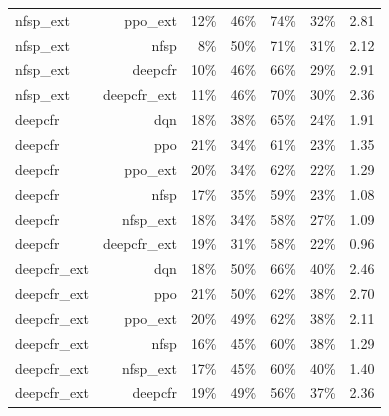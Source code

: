 \begin{tabular}{lrrrrrr}
nfsp\_ext & ppo\_ext & 12\% & 46\% & 74\% & 32\% & 2.81 \\
nfsp\_ext & nfsp & 8\% & 50\% & 71\% & 31\% & 2.12 \\
nfsp\_ext & deepcfr & 10\% & 46\% & 66\% & 29\% & 2.91 \\
nfsp\_ext & deepcfr\_ext & 11\% & 46\% & 70\% & 30\% & 2.36 \\
deepcfr & dqn & 18\% & 38\% & 65\% & 24\% & 1.91 \\
deepcfr & ppo & 21\% & 34\% & 61\% & 23\% & 1.35 \\
deepcfr & ppo\_ext & 20\% & 34\% & 62\% & 22\% & 1.29 \\
deepcfr & nfsp & 17\% & 35\% & 59\% & 23\% & 1.08 \\
deepcfr & nfsp\_ext & 18\% & 34\% & 58\% & 27\% & 1.09 \\
deepcfr & deepcfr\_ext & 19\% & 31\% & 58\% & 22\% & 0.96 \\
deepcfr\_ext & dqn & 18\% & 50\% & 66\% & 40\% & 2.46 \\
deepcfr\_ext & ppo & 21\% & 50\% & 62\% & 38\% & 2.70 \\
deepcfr\_ext & ppo\_ext & 20\% & 49\% & 62\% & 38\% & 2.11 \\
deepcfr\_ext & nfsp & 16\% & 45\% & 60\% & 38\% & 1.29 \\
deepcfr\_ext & nfsp\_ext & 17\% & 45\% & 60\% & 40\% & 1.40 \\
deepcfr\_ext & deepcfr & 19\% & 49\% & 56\% & 37\% & 2.36 \\
\bottomrule
\end{tabular}
